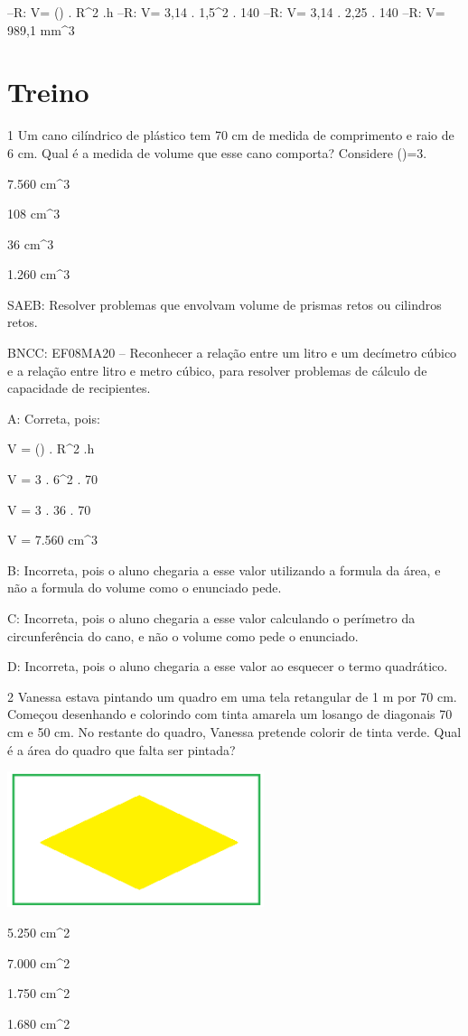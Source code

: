 {--R: V= (\Pi) . R^2 .h
--R: V= 3,14 . 1,5^2 . 140
--R: V= 3,14 . 2,25 . 140
--R: V= 989,1 mm^3

\section{Treino}

\num{1} Um cano cilíndrico de plástico tem 70 cm de medida de comprimento e
raio de 6 cm. Qual é a medida de volume que esse cano comporta?
Considere (\Pi)=3.
\item 7.560 cm^3
\item 108 cm^3
\item 36 cm^3
\item 1.260 cm^3

SAEB: Resolver problemas que envolvam volume de prismas retos ou
cilindros retos.

BNCC: EF08MA20 -- Reconhecer a relação entre um litro e um decímetro
cúbico e a relação entre litro e metro cúbico, para resolver problemas
de cálculo de capacidade de recipientes.

A: Correta, pois:

V = (\Pi) . R^2 .h

V = 3 . 6^2 . 70

V = 3 . 36 . 70

V = 7.560 cm^3

B: Incorreta, pois o aluno chegaria a esse valor utilizando a formula da
área, e não a formula do volume como o enunciado pede.

C: Incorreta, pois o aluno chegaria a esse valor calculando o perímetro
da circunferência do cano, e não o volume como pede o enunciado.

D: Incorreta, pois o aluno chegaria a esse valor ao esquecer o termo
quadrático.

\num{2} Vanessa estava pintando um quadro em uma tela retangular de 1 m por
70 cm. Começou desenhando e colorindo com tinta amarela um losango de
diagonais 70 cm e 50 cm. No restante do quadro, Vanessa pretende colorir
de tinta verde. Qual é a área do quadro que falta ser pintada?

\includegraphics[width=2.95833in,height=1.56526in]{./imgSAEB_8_MAT/media/image54.png}
\item 5.250 cm^2
\item 7.000 cm^2
\item 1.750 cm^2
\item 1.680 cm^2

}

